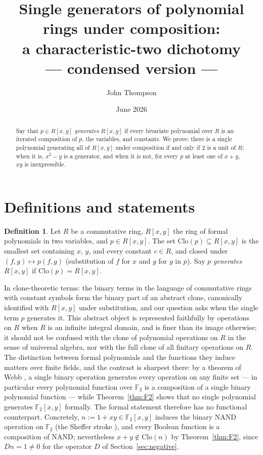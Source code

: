 \documentclass[11pt]{article}
\title{Single generators of polynomial rings under composition:\\
a characteristic-two dichotomy\\[1ex] {\large\normalfont --- condensed version ---}}
\author{John Thompson}
\date{June 2026}
\theoremstyle{definition}
\newtheorem{definition}{Definition}
\newcommand{\F}{\mathbb{F}}
\newcommand{\Clo}{\mathrm{Clo}}
\begin{document}
\maketitle

\begin{abstract}
Say that $p \in R[x,y]$ \emph{generates} $R[x,y]$ if every bivariate
polynomial over $R$ is an iterated composition of $p$, the variables,
and constants.  We prove: there is a single polynomial generating all
of $R[x,y]$ under composition if and only if $2$ is a unit of $R$;
when it is, $x^2 - y$ is a generator, and when it is not, for every
$p$ at least one of $x+y$, $xy$ is inexpressible.
\end{abstract}

\section{Definitions and statements}\label{sec:prelim}

\begin{definition}\label{def:clone}
Let $R$ be a commutative ring, $R[x,y]$ the ring of formal
polynomials in two variables, and $p \in R[x,y]$.  The set
$\Clo(p) \subseteq R[x,y]$ is the smallest set containing $x$, $y$,
and every constant $c \in R$, and closed under
$(f,g) \mapsto p(f,g)$ (substitution of $f$ for $x$ and $g$ for $y$
in $p$).  Say $p$ \emph{generates} $R[x,y]$ if $\Clo(p) = R[x,y]$.
\end{definition}

In clone-theoretic terms: the binary terms in the language of
commutative rings with constant symbols form the binary part of an
abstract clone, canonically identified with $R[x,y]$ under
substitution, and our question asks when the single term $p$
generates it.  This abstract object is represented faithfully by
operations on $R$ when $R$ is an infinite integral domain, and is
finer than its image otherwise; it should not be confused with the
clone of polynomial operations on $R$ in the sense of universal
algebra, nor with the full clone of all finitary operations on $R$.
The distinction between formal polynomials and the functions they
induce matters over finite fields, and the contrast is sharpest
there: by a theorem of Webb \cite{Webb}, a single binary operation
generates every operation on any finite set --- in particular every
polynomial function over $\F_2$ is a composition of a single binary
polynomial function --- while Theorem~\ref{thm:F2} shows that no
single polynomial generates $\F_2[x,y]$ formally.  The formal
statement therefore has no functional counterpart.  Concretely,
$n := 1 + xy \in \F_2[x,y]$ induces the binary NAND operation on
$\F_2$ (the Sheffer stroke \cite{Sheffer}), and every Boolean
function is a composition of NAND; nevertheless
$x + y \notin \Clo(n)$ by Theorem~\ref{thm:F2}, since $Dn = 1 \neq 0$
for the operator $D$ of Section~\ref{sec:negative}.
\end{document}
